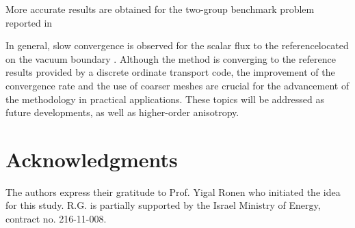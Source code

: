 \DIFaddbegin 

\DIFaddend More accurate results are obtained for the two-group benchmark problem reported in \cite{Tomatis-2011} \DIFdelbegin {}\DIFdelend \DIFaddbegin {}

\DIFaddend In general, slow convergence is observed for the scalar flux \DIFdelbegin {}\DIFdelend \DIFaddbegin {}\DIFaddend to the reference\DIFdelbegin {}\DIFdelend \DIFaddbegin \DIFadd{, }\DIFaddend located on the vacuum boundary \DIFaddbegin {}\DIFaddend . Although the method is converging to the reference results provided by a discrete ordinate transport code, the improvement of the convergence rate and the use of coarser meshes are crucial for the advancement of the methodology in practical applications. These topics will be addressed as future developments, as well as \DIFdelbegin {}\DIFdelend higher-order anisotropy.

%
\section*{Acknowledgments}
\label{sec:acknow}
\DIFdelbegin %

\DIFdelend The authors express their gratitude to Prof. Yigal Ronen who initiated the idea for this study. R.G. is partially supported by the Israel Ministry of Energy, contract no. 216-11-008. 




%




